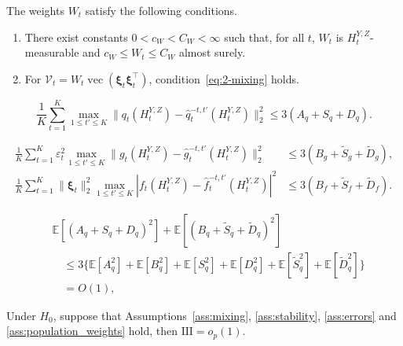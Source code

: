 \documentclass[10pt,a4paper]{amsart}
\def\E{\mathbb{E}}
\begin{document}
\begin{assumption}
\label{ass:population_weights}
The weights \(W_t\) satisfy the following conditions.
\begin{enumerate}
    \item[(i)] There exist constants \(0<c_W<C_W<\infty\) such that, for all
    \(t\), \(W_t\) is \(H_t^{Y,Z}\)-measurable and
    \(c_W\leq W_t\leq C_W\) almost surely.

    \item[(ii)] For
\(\mathcal V_t
=W_t\operatorname{vec}(\boldsymbol\xi_t\boldsymbol\xi_t^\top)\),
condition~\eqref{eq:2-mixing} holds.
\end{enumerate}
\end{assumption}

\begin{equation}
\label{eq:deleted-prediction-envelope}
\frac1K\sum_{t=1}^K\max_{1\leq t'\leq K}
\|q_t(H_t^{Y,Z})-\hat q_t^{-t,t'}(H_t^{Y,Z})\|_2^2
\leq3(A_q+S_q+D_q).
\end{equation}

\begin{equation}
\label{eq:deleted-residual-envelope}
\begin{aligned}
\frac1K\sum_{t=1}^K\varepsilon_t^2
\max_{1\leq t'\leq K}
\|g_t(H_t^{Y,Z})-\hat g_t^{-t,t'}(H_t^{Y,Z})\|_2^2
&\leq3(B_g+\tilde S_g+\tilde D_g),\\
\frac1K\sum_{t=1}^K\|\boldsymbol\xi_t\|_2^2
\max_{1\leq t'\leq K}
|f_t(H_t^{Y,Z})-\hat f_t^{-t,t'}(H_t^{Y,Z})|^2
&\leq3(B_f+\tilde S_f+\tilde D_f).
\end{aligned}
\end{equation}

\begin{equation}
\label{eq:deleted-error-moments}
\begin{aligned}
&\E[(A_q+S_q+D_q)^2]
+\E[(B_q+\tilde S_q+\tilde D_q)^2]\\
&\quad\leq3\big\{\E[A_q^2]+\E[B_q^2]+\E[S_q^2]+\E[D_q^2]
+\E[\tilde S_q^2]+\E[\tilde D_q^2]\big\}\\
&\quad=O(1),
\end{aligned}
\end{equation}

\begin{lemma}
\label{lem:outcome-remainder-moments}
Under \(H_0\), suppose that Assumptions~\ref{ass:mixing},
\ref{ass:stability}, \ref{ass:errors} and
\ref{ass:population_weights} hold,
then \(\mathrm{III}=o_p(1)\). 
\end{lemma}
\end{document}

